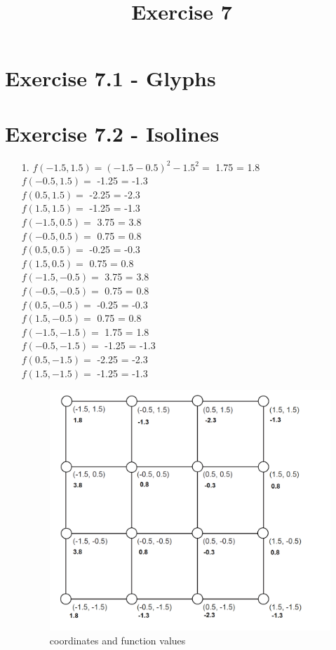 \documentclass[a4paper]{article}
\date{}
\author{}
\title{Exercise 7}
\begin{document}
\maketitle 
\thispagestyle{fancy}


\section*{Exercise 7.1 - Glyphs}


\section*{Exercise 7.2 - Isolines}

\begin{enumerate}
	\item[1.] 	$f(-1.5, 1.5) = (-1.5 - 0.5)^{2} - 1.5^{2} =$ 1.75 = 1.8\\
				$f(-0.5, 1.5) =$ -1.25 = -1.3\\
				$f(0.5, 1.5) =$ -2.25 = -2.3\\
				$f(1.5, 1.5) =$ -1.25 = -1.3\\
				$f(-1.5, 0.5) =$ 3.75 = 3.8\\
				$f(-0.5, 0.5) =$ 0.75 = 0.8\\
				$f(0.5, 0.5) =$ -0.25 = -0.3\\
				$f(1.5, 0.5) =$ 0.75 = 0.8\\
				$f(-1.5, -0.5) =$ 3.75 = 3.8\\
				$f(-0.5, -0.5) =$ 0.75 = 0.8\\
				$f(0.5, -0.5) =$ -0.25 = -0.3\\
				$f(1.5, -0.5) =$ 0.75 = 0.8 \\
				$f(-1.5, -1.5) =$ 1.75 = 1.8 \\
				$f(-0.5, -1.5) =$ -1.25 = -1.3\\
				$f(0.5, -1.5) =$ -2.25 = -2.3\\
				$f(1.5, -1.5) =$ -1.25 = -1.3\\
				
				\begin{figure}[h!]
					\centering 
					\includegraphics[width=11cm]{7_2_1.png}
					\caption{coordinates and function values }
					\label{fig:coordinates}
				\end{figure}


\end{enumerate}
\end{document}
